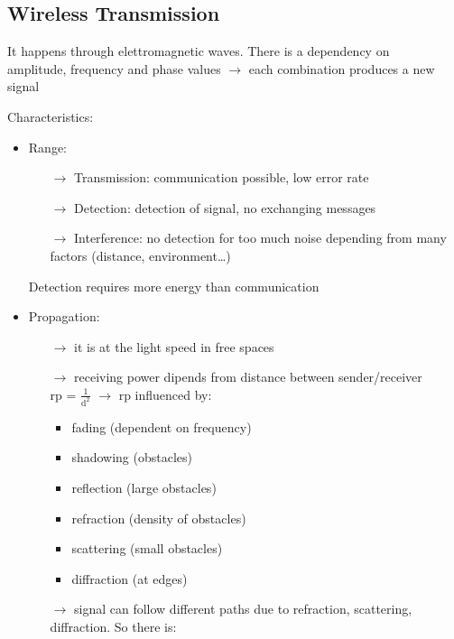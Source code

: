 \subsection{Wireless Transmission}

It happens through elettromagnetic waves. There is a dependency on\\amplitude,
frequency and phase values $\rightarrow$ each combination produces a new signal

Characteristics:
\begin{itemize}
    \item Range:
    \begin{itemize}
        \item[$\rightarrow$] Transmission: communication possible, low error rate
        \item[$\rightarrow$] Detection: detection of signal, no exchanging
        messages
        \item[$\rightarrow$] Interference: no detection for too much noise
        depending from many \\factors (distance, environment\dots)
    \end{itemize}
    Detection requires more energy than communication
    \item Propagation:
    \begin{itemize}
        \item[$\rightarrow$] it is at the light speed in free spaces
        \item[$\rightarrow$] receiving power dipends from distance between
        sender/receiver\\
        rp = $\frac{1}{\text{d}^2}$ $\rightarrow$ rp influenced by:
        \begin{itemize}
            \item fading (dependent on frequency)
            \item shadowing (obstacles)
            \item reflection (large obstacles)
            \item refraction (density of obstacles)
            \item scattering (small obstacles)
            \item diffraction (at edges)
        \end{itemize}
        \item[$\rightarrow$] signal can follow different paths due to refraction,
        scattering, diffraction. So there is:
        \begin{itemize}

\end{itemize}
\end{itemize}
\end{itemize}
